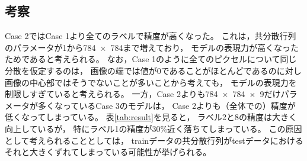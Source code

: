 \documentclass[class=jsarticle, crop=false, dvipdfmx, fleqn]{standalone}
\begin{document}
\clearpage
\subsection*{考察}

Case 2ではCase 1より全てのラベルで精度が高くなった。
これは，共分散行列のパラメータが1から\num{784 x 784}まで増えており，
モデルの表現力が高くなったためであると考えられる。
なお，Case 1のように全てのピクセルについて同じ分散を仮定するのは，
画像の端では値が0であることがほとんどであるのに対し
画像の中心部ではそうでないことが多いことから考えても，
モデルの表現力を制限しすぎていると考えられる。
一方，Case 2よりも\num{784 x 784 x 9}だけパラメータが多くなっているCase 3のモデルは，
Case 2よりも（全体での）精度が低くなってしまっている。
表\ref{tab:result}を見ると，
ラベル2と8の精度は大きく向上しているが，
特にラベル1の精度が30{\%}近く落ちてしまっている。
この原因として考えられることとしては，
trainデータの共分散行列がtestデータにおけるそれと大きくずれてしまっている可能性が挙げられる。
\end{document}
